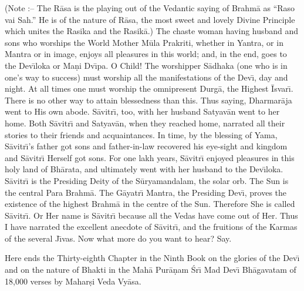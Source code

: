 (Note :-- The R\=asa is the playing out of the Vedantic saying of Brahm\=a as ``Raso vai Sah.'' He is of the nature of R\=asa, the most sweet and lovely Divine Principle which unites the Rasika and the Rasik\=a.) The chaste woman having husband and sons who worships the World Mother M\=ula Prakriti, whether in Yantra, or in Mantra or in image, enjoys all pleasures in this world; and, in the end, goes to the Dev\={\i}loka or Ma\d{n}i Dv\={\i}pa. O Child! The worshipper S\=adhaka (one who is in one's way to success) must worship all the manifestations of the Dev\={\i}, day and night. At all times one must worship the omnipresent Durg\=a, the Highest \=Isvar\={\i}. There is no other way to attain blessedness than this. Thus saying, Dharmar\=aja went to His own abode. S\=avitr\={\i}, too, with her husband Satyav\=an went to her home. Both S\=avitr\={\i} and Satyav\=an, when they reached home, narrated all their stories to their friends and acquaintances. In time, by the blessing of Yama, S\=avitr\={\i}'s father got sons and father-in-law recovered his eye-sight and kingdom and S\=avitr\={\i} Herself got sons. For one lakh years, S\=avitr\={\i} enjoyed pleasures in this holy land of Bh\=arata, and ultimately went with her husband to the Dev\={\i}loka. S\=avitr\={\i} is the Presiding Deity of the S\=uryamandalam, the solar orb. The Sun is the central Para Brahm\=a. The G\=ayatr\={\i} Mantra, the Presiding Dev\={\i}, proves the existence of the highest Brahm\=a in the centre of the Sun. Therefore She is called S\=avitr\={\i}. Or Her name is S\=avitr\={\i} because all the Vedas have come out of Her. Thus I have narrated the excellent anecdote of S\=avitr\={\i}, and the fruitions of the Karmas of the several J\={\i}vas. Now what more do you want to hear? Say.

Here ends the Thirty-eighth Chapter in the Ninth Book on the glories of the Dev\={\i} and on the nature of Bhakti in the Mah\=a Pur\=a\d{n}am \'Sr\={\i} Mad Dev\={\i} Bh\=agavatam of 18,000 verses by Mahar\d{s}i Veda Vy\=asa.



